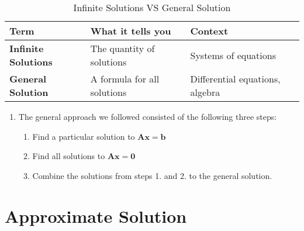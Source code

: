 \begin{customArrayStretch}{1.3}
\begin{table}[H]
    \centering
    \begin{tabular}{|l|l|l|}
        \hline
        \textbf{Term} &
            \textbf{What it tells you} &
            \textbf{Context} \\ \hline

        \textbf{Infinite Solutions} &
            The quantity of solutions &
            Systems of equations \\ \hline

        \textbf{General Solution} &
            A formula for all solutions &
            Differential equations, algebra \\ \hline

    \end{tabular}
    \caption*{Infinite Solutions VS General Solution \cite{common/online/chatgpt}}
\end{table}
\end{customArrayStretch}


\begin{enumerate}
    \item The general approach we followed consisted of the following three steps:
    \begin{enumerate}
        \item Find a particular solution to $\bm{Ax} = \bm{b}$
        \hfill \cite{mfml/book/mml/Deisenroth-Faisal-Ong}

        \item Find all solutions to $\bm{Ax} = \bm{0}$
        \hfill \cite{mfml/book/mml/Deisenroth-Faisal-Ong}

        \item Combine the solutions from steps 1. and 2. to the general solution.
        \hfill \cite{mfml/book/mml/Deisenroth-Faisal-Ong}
    \end{enumerate}


\end{enumerate}









\section{Approximate Solution}

